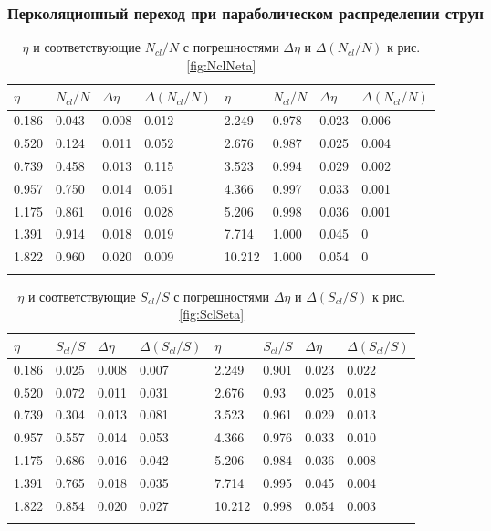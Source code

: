 \subsubsection{Перколяционный переход при параболическом распределении струн}
{\scriptsize
\begin{longtable}{| l | l | l | l || l | l | l | l |}
	\hline
	$\eta$	&	$N_{cl}/N$	&	$\Delta \eta$	&	$\Delta (N_{cl}/N)$	&	$\eta$	&	$N_{cl}/N$	&	$\Delta \eta$	&	$\Delta (N_{cl}/N)$	\\
	\hline
	0.186	&	0.043	&	0.008	&	0.012	&	2.249	&	0.978	&	0.023	&	0.006	\\
	0.520	&	0.124	&	0.011	&	0.052	&	2.676	&	0.987	&	0.025	&	0.004	\\
	0.739	&	0.458	&	0.013	&	0.115	&	3.523	&	0.994	&	0.029	&	0.002	\\
	0.957	&	0.750	&	0.014	&	0.051	&	4.366	&	0.997	&	0.033	&	0.001	\\
	1.175	&	0.861	&	0.016	&	0.028	&	5.206	&	0.998	&	0.036	&	0.001	\\
	1.391	&	0.914	&	0.018	&	0.019	&	7.714	&	1.000	&	0.045	&	0	\\
	1.822	&	0.960	&	0.020	&	0.009	&	10.212	&	1.000	&	0.054	&	0	\\
	\hline
	\caption{$\eta$ и соответствующие $N_{cl}/N$ с погрешностями $\Delta \eta$ и $\Delta (N_{cl}/N)$ к рис. \ref{fig:NclNeta}} \label{tab:NclNeta}
\end{longtable}}

{\scriptsize
\begin{longtable}{| l | l | l | l || l | l | l | l |}
	\hline
	$\eta$	&	$S_{cl}/S$	&	$\Delta \eta$	&	$\Delta (S_{cl}/S)$	&	$\eta$	&	$S_{cl}/S$	&	$\Delta \eta$	&	$\Delta (S_{cl}/S)$	\\
	\hline
	0.186	&	0.025	&	0.008	&	0.007	&	2.249	&	0.901	&	0.023	&	0.022	\\
	0.520	&	0.072	&	0.011	&	0.031	&	2.676	&	0.93	&	0.025	&	0.018	\\
	0.739	&	0.304	&	0.013	&	0.081	&	3.523	&	0.961	&	0.029	&	0.013	\\
	0.957	&	0.557	&	0.014	&	0.053	&	4.366	&	0.976	&	0.033	&	0.010	\\
	1.175	&	0.686	&	0.016	&	0.042	&	5.206	&	0.984	&	0.036	&	0.008	\\
	1.391	&	0.765	&	0.018	&	0.035	&	7.714	&	0.995	&	0.045	&	0.004	\\
	1.822	&	0.854	&	0.020	&	0.027	&	10.212	&	0.998	&	0.054	&	0.003	\\
	\hline
	\caption{$\eta$ и соответствующие $S_{cl}/S$ с погрешностями $\Delta \eta$ и $\Delta (S_{cl}/S)$ к рис. \ref{fig:SclSeta}} \label{tab:SclSeta}
\end{longtable}}

